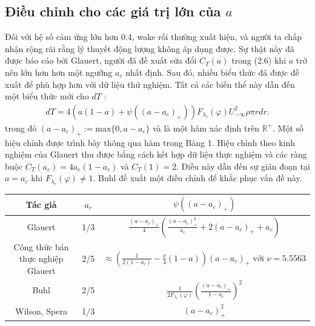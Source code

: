 \documentclass[a4paper,twoside,13pt]{extbook}
\begin{document}
\subsection{Điều chỉnh cho các giá trị lớn của $a$}
Đối với hệ số cảm ứng lớn hơn 0.4, wake rối thường xuất hiện, và người ta chấp nhận rộng rãi rằng lý thuyết động lượng không áp dụng được. Sự thật này đã được báo cáo bởi Glauert, người đã đề xuất sửa đổi $C_T (a)$ trong (2.6) khi $a$ trở nên lớn hơn hơn một ngưỡng $a_c$ nhất định. Sau đó, nhiều biểu thức đã được đề xuất để phù hợp hơn với dữ liệu thử nghiệm. Tất cả các biến thể này dẫn đến một biểu thức mới cho $dT$ :
\begin{equation}\label{eq:1_18}
    \begin{aligned}
        dT = 4\left( {a\left( {1 - a} \right) + \psi \left( {{{\left( {a - {a_c}} \right)}_ + }} \right)} \right){F_{{\lambda _r}}}\left( \varphi  \right)U_{ - \infty }^2\rho \pi rdr.
    \end{aligned}
\end{equation}
trong đó $(a-a_c)_+ := \text{max}\{0,a-a_c\}$ và là một hàm xác định trên $\mathbb{R}^+$. Một số hiệu chỉnh được trình bày thông qua hàm trong Bảng 1. Hiệu chỉnh theo kinh nghiệm của Glauert thu được bằng cách kết hợp dữ liệu thực nghiệm và các ràng buộc $C_T(a_c) = 4a_c(1-a_c)$ và $C_T (1) = 2$. Điều này dẫn đến sự gián đoạn tại $a = a_c$ khi $F_{\lambda_r}(\varphi)\ne 1$. Buhl đề xuất một điều chỉnh để khắc phục vấn đề này.
\begin{table}[h!]
    \centering
        \begin{tabular}{|c ||c |c|} 
        \hline
            Tác giả & $a_c$ & $\psi((a-a_c)_+)$ \\ [0.5ex] 
            \hline\hline
            Glauert & 1/3 & $\frac{{{{\left( {a - {a_c}} \right)}_ + }}}{4}\left( {\frac{{\left( {a - {a_c}} \right)_ + ^2}}{{{a_c}}} + 2{{\left( {a - {a_c}} \right)}_ + } + {a_c}} \right)$ \\
            \hline
            Công thức bán thực nghiệp Glauert & 2/5 & $\approx \left( {\frac{1}{{2\left( {1 - {a_c}} \right)}} - \frac{\nu }{4}\left( {1 - a} \right)} \right){\left( {a - {a_c}} \right)_ + } \text{ với }\nu = 5.5563$ \\
            \hline
            Buhl & 2/5 & $\frac{1}{{2{F_{{\lambda _r}}}\left( \varphi  \right)}}{\left( {\frac{{{{\left( {a - {a_c}} \right)}_ + }}}{{1 - {a_c}}}} \right)^2}$ \\
            \hline
            Wilson, Spera & 1/3 & $\left( {a - {a_c}} \right)_ + ^2$ \\ [1ex] 
    \hline
    \end{tabular}
\end{table}
\end{document}
